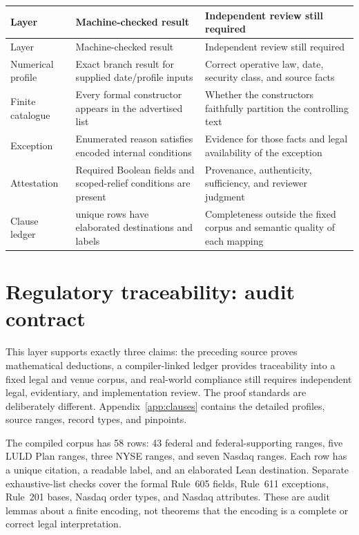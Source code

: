 \documentclass[11pt]{article}
\theoremstyle{definition}
\theoremstyle{remark}
\begin{document}
{\begin{longtable}{@{}>{\raggedright\arraybackslash}p{}>{\raggedright\arraybackslash}p{}>{\raggedright\arraybackslash}p{}@{}}
\toprule
Layer & Machine-checked result & Independent review still required \\
\midrule
\endfirsthead
\toprule
Layer & Machine-checked result & Independent review still required \\
\midrule
\endhead
\bottomrule
\endfoot
Numerical profile & Exact branch result for supplied date/profile inputs & Correct operative law, date, security class, and source facts \\[3pt]
Finite catalogue & Every formal constructor appears in the advertised list & Whether the constructors faithfully partition the controlling text \\[3pt]
Exception & Enumerated reason satisfies encoded internal conditions & Evidence for those facts and legal availability of the exception \\[3pt]
Attestation & Required Boolean fields and scoped-relief conditions are present & Provenance, authenticity, sufficiency, and reviewer judgment \\[3pt]
Clause ledger & 58 unique rows have elaborated destinations and labels & Completeness outside the fixed corpus and semantic quality of each mapping \\
\end{longtable}

}

\section{Regulatory traceability: audit contract}\label{sec:clauses}\label{sec:companion}

This layer supports exactly three claims: the preceding source proves mathematical deductions, a compiler-linked ledger provides traceability into a fixed legal and venue corpus, and real-world compliance still requires independent legal, evidentiary, and implementation review. The proof standards are deliberately different. Appendix~\ref{app:clauses} contains the detailed profiles, source ranges, record types, and pinpoints.

The compiled corpus has 58 rows: 43 federal and federal-supporting ranges, five LULD Plan ranges, three NYSE ranges, and seven Nasdaq ranges. Each row has a unique citation, a readable label, and an elaborated Lean destination. Separate exhaustive-list checks cover the formal Rule~605 fields, Rule~611 exceptions, Rule~201 bases, Nasdaq order types, and Nasdaq attributes. These are audit lemmas about a finite encoding, not theorems that the encoding is a complete or correct legal interpretation.
\end{document}
